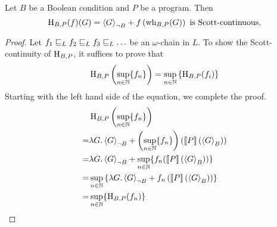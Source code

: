 \begin{lemma}[continues=lem:ext:scottcontinuous]
	Let $B$ be a Boolean condition and $P$ be a program.
	Then \[ \hh(f)(G) = \resN{G} + f \l( \wh(G) \r) \text{ is Scott-continuous.} \]
	\begin{proof}
		Let $f_1 \leqL f_2 \leqL f_3 \leqL \ldots$ be an $\omega$-chain in $L$.
		To show the Scott-continuity of $\hh$, it suffices to prove that
		\[ \hh\l( \sup_{n \in \N} \{ f_n \} \r) = \sup_{n \in \N} \l\{ \hh(f_i) \r\} \]
		Starting with the left hand side of the equation, we complete the proof.
		\begin{align*}
			 & \hh\l( \sup_{n \in \N} \{ f_n \} \r) \\
			=& \lambda G. \resN{G} + \l( \sup_{n \in \N} \{ f_n \} \r) ( \smtx{P}(\resP{G}) ) \\
			=& \lambda G. \resN{G} + \sup_{n \in \N} \{ f_n ( \smtx{P}(\resP{G}) ) \} \\
			=& \sup_{n \in \N} \l\{ \lambda G. \resN{G} + f_n \l( \smtx{P}(\resP{G}) \r) \r\} \\
			=& \sup_{n \in \N} \{ \hh(f_n) \}		\qedhere
		\end{align*}
	\end{proof}
\end{lemma}
